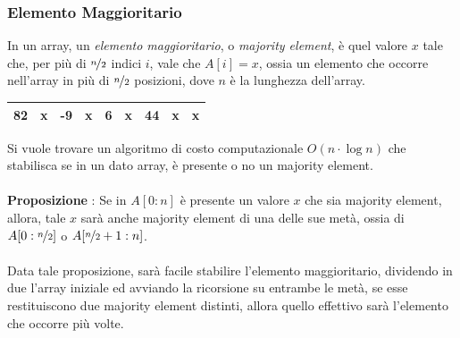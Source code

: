 \documentclass[12pt, letterpaper]{article}
\newcommand{\acc}{\\\hphantom{}\\}
\begin{document}
\subsubsection{Elemento Maggioritario}
In un array, un \textit{elemento maggioritario}, o \textit{majority element}, è quel valore $x$ tale che,
per più di $\nicefrac{n}{2}$ indici $i$, vale che $A[i]=x$, ossia un elemento che occorre nell'array in più di
$\nicefrac{n}{2}$ posizioni, dove $n$ è la lunghezza dell'array.
\begin{center}
    \begin{tabular}{|c|c|c|c|c|c|c|c|c|}
        \hline
        82 & x & -9 & x & 6 & x & 44 & x & x \\ \hline
    \end{tabular}
\end{center}
Si vuole trovare un algoritmo di costo computazionale $O(n\cdot\log{n})$ che stabilisca se in un dato array, è
presente o no un majority element.\acc
\textbf{Proposizione} : Se in $A[0:n]$ è presente un valore $x$ che sia majority element, allora,  tale $x$ sarà
anche majority element di una delle sue metà, ossia di $A[0:\nicefrac{n}{2}]$ o $A[\nicefrac{n}{2}+1:n]$.\acc
Data tale proposizione, sarà facile stabilire l'elemento maggioritario, dividendo in due l'array iniziale ed avviando la ricorsione
su entrambe le metà, se esse restituiscono due majority element distinti, allora quello effettivo sarà l'elemento che occorre più volte.
\end{document}
